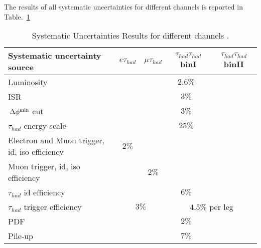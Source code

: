 The results of all systematic uncertainties for different channels is reported in Table.~\ref{Tab.SYS}

\begin{table}[!h]
\begin{center}
\small{
\begin{tabular}{|l|c|c|c|c|}
\hline\hline
Systematic uncertainty source & $e\tau_{had}$ & $\mu\tau_{had}$ & $\tau_{had}\tau_{had}$ binI & $\tau_{had}\tau_{had}$ binII\\
\hline\hline
{Luminosity}&\multicolumn{4}{|c|}{$2.6\%$} \\\hline
{ISR}&\multicolumn{4}{|c|}{$3\%$} \\\hline
{$\,{\Delta\phi^{\rm min}}$ cut}&\multicolumn{4}{|c|}{$3\%$} \\\hline
{$\tau_{had}$ energy scale}&\multicolumn{4}{|c|}{$25\%$} \\\hline
{Electron and Muon trigger, id, iso efficiency}& $2\%$ & \multicolumn{3}{|c|}{} \\\hline
{Muon trigger, id, iso efficiency}& &$2\%$ & \multicolumn{2}{|c|}{} \\\hline
{$\tau_{had}$ id efficiency}& \multicolumn{4}{|c|}{$6\%$} \\\hline
{$\tau_{had}$ trigger efficiency}& \multicolumn{2}{|c|}{$3\%$}&\multicolumn{2}{|c|}{$4.5\%$ per leg} \\\hline
{PDF}&\multicolumn{4}{|c|}{$2\%$} \\\hline
{Pile-up}&\multicolumn{4}{|c|}{$7\%$} \\
\hline\hline
\end{tabular}
}
\end{center}
\caption{
  Systematic Uncertainties Results for different channels .
}
\label{Tab.SYS}
\end{table}
